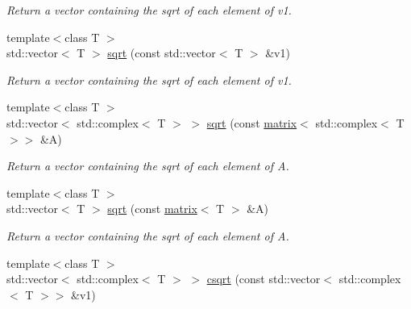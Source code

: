 \begin{DoxyCompactItemize}
\begin{DoxyCompactList}\small\item\em Return a vector containing the sqrt of each element of v1. \end{DoxyCompactList}\item 
\hypertarget{namespacekeycpp_a8677ad8b7dc8485540330a632cb82994}{{\footnotesize template$<$class T $>$ }\\std\-::vector$<$ T $>$ \hyperlink{namespacekeycpp_a8677ad8b7dc8485540330a632cb82994}{sqrt} (const std\-::vector$<$ T $>$ \&v1)}\label{namespacekeycpp_a8677ad8b7dc8485540330a632cb82994}

\begin{DoxyCompactList}\small\item\em Return a vector containing the sqrt of each element of v1. \end{DoxyCompactList}\item 
\hypertarget{namespacekeycpp_a2955a17019e584c29d9cce73ea572adc}{{\footnotesize template$<$class T $>$ }\\std\-::vector$<$ std\-::complex$<$ T $>$ $>$ \hyperlink{namespacekeycpp_a2955a17019e584c29d9cce73ea572adc}{sqrt} (const \hyperlink{classkeycpp_1_1matrix}{matrix}$<$ std\-::complex$<$ T $>$$>$ \&A)}\label{namespacekeycpp_a2955a17019e584c29d9cce73ea572adc}

\begin{DoxyCompactList}\small\item\em Return a vector containing the sqrt of each element of A. \end{DoxyCompactList}\item 
\hypertarget{namespacekeycpp_ab542118d6ab4772a4f100df097f7d55d}{{\footnotesize template$<$class T $>$ }\\std\-::vector$<$ T $>$ \hyperlink{namespacekeycpp_ab542118d6ab4772a4f100df097f7d55d}{sqrt} (const \hyperlink{classkeycpp_1_1matrix}{matrix}$<$ T $>$ \&A)}\label{namespacekeycpp_ab542118d6ab4772a4f100df097f7d55d}

\begin{DoxyCompactList}\small\item\em Return a vector containing the sqrt of each element of A. \end{DoxyCompactList}\item 
\hypertarget{namespacekeycpp_a9e9303ca44f49ec926854e6ad9506050}{{\footnotesize template$<$class T $>$ }\\std\-::vector$<$ std\-::complex$<$ T $>$ $>$ \hyperlink{namespacekeycpp_a9e9303ca44f49ec926854e6ad9506050}{csqrt} (const std\-::vector$<$ std\-::complex$<$ T $>$$>$ \&v1)}\label{namespacekeycpp_a9e9303ca44f49ec926854e6ad9506050}


\end{DoxyCompactItemize}
